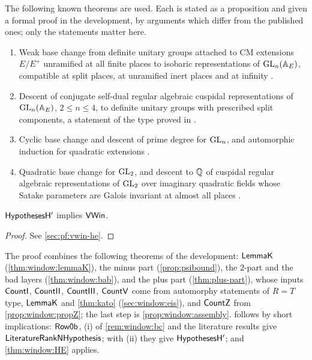 \begin{remark}\label{rem:window:bc}
The following known theorems are used. Each is stated as a proposition and given a formal proof in the
development, by arguments which differ from the published ones; only the statements matter here.
\begin{enumerate}[label=(\roman*)]
\item Weak base change from definite unitary groups attached to CM extensions $E/E^+$ unramified at all finite
  places to isobaric representations of $\operatorname{GL}_n(\mathbb{A}_E)$, compatible at split places, at unramified inert places and
  at infinity \cite{Labesse2011}.
\item Descent of conjugate self-dual regular algebraic cuspidal representations of $\operatorname{GL}_n(\mathbb{A}_E)$, $2\le n\le4$, to
  definite unitary groups with prescribed split components, a statement of the type proved in \cite{Labesse2011}.
\item Cyclic base change and descent of prime degree for $\operatorname{GL}_n$, and automorphic induction for quadratic
  extensions \cite{ArthurClozel1989}.
\item Quadratic base change for $\operatorname{GL}_2$, and descent to $\mathbb{Q}$ of cuspidal regular algebraic representations of
  $\operatorname{GL}_2$ over imaginary quadratic fields whose Satake parameters are Galois invariant at almost all places
  \cite{Langlands1980}.
\end{enumerate}
\end{remark}

\begin{theorem}\Fmark\label{thm:window:HE}
$\mathsf{HypothesesH'}$ implies $\mathsf{VWin}$.
\end{theorem}
\begin{proof}See \cref{sec:pf:vwin-he}.
\end{proof}


The proof combines the following theorems of the development: $\mathsf{LemmaK}$ (\cref{thm:window:lemmaK}), the
minus part (\cref{prop:psibound}), the $2$-part and the bad layers (\cref{thm:window:bab}), and the plus part
(\cref{thm:plus-part}), whose inputs $\mathsf{CountI}$, $\mathsf{CountII}$, $\mathsf{CountIII}$, $\mathsf{CountV}$
come from automorphy statements of $R=T$ type, $\mathsf{LemmaK}$ and \cref{thm:kato} (\cref{sec:window:eis}), and
$\mathsf{CountZ}$ from \cref{prop:window:propZ}; the last step is \cref{prop:window:assembly}. 
follows by short implications: $\mathsf{Row0b}$, (i) of \cref{rem:window:bc} and the literature results give
$\mathsf{LiteratureRankNHypothesis}$; with (ii) they give $\mathsf{HypothesesH'}$; and \cref{thm:window:HE} applies.


